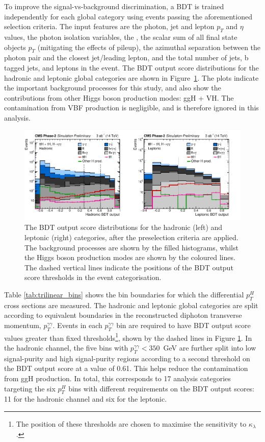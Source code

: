 To improve the signal-vs-background discrimination, a BDT is trained independently for each global category using events passing the aforementioned selection criteria. The input features are the photon, jet and lepton $p_T$ and $\eta$ values, the photon isolation variables, the \met, the scalar sum of all final state objects $p_T$ (mitigating the effects of pileup), the azimuthal separation between the photon pair and the closest jet/leading lepton, and the total number of jets, b tagged jets, and leptons in the event. The BDT output score distributions for the hadronic and leptonic global categories are shown in Figure~\ref{fig:trilinear_bdt}. The plots indicate the important background processes for this study, and also show the contributions from other Higgs boson production modes: ggH + VH. The contamination from VBF production is negligible, and is therefore ignored in this analysis.

\begin{figure}
  \centering
  \includegraphics[width=1\textwidth]{Figures/cms/trilinear/CMS-PAS-FTR-18-020_Figure_002.pdf}
  \caption[BDT output score distributions for the HL-LHC sensitivity study]
  {
    The BDT output score distributions for the hadronic (left) and leptonic (right) categories, after the preselection criteria are applied. The background processes are shown by the filled histograms, whilst the Higgs boson production modes are shown by the coloured lines. The dashed vertical lines indicate the positions of the BDT output score thresholds in the event categorisation.
  }
  \label{fig:trilinear_bdt}
\end{figure}

Table \ref{tab:trilinear_bins} shows the bin boundaries for which the differential $p_T^H$ cross sections are measured. The hadronic and leptonic global categories are split according to equivalent boundaries in the reconstructed diphoton transverse momentum, $p_T^{\gamma\gamma}$. Events in each $p_T^{\gamma\gamma}$ bin are required to have BDT output score values greater than fixed thresholds\footnote{The position of these thresholds are chosen to maximise the sensitivity to $\kappa_\lambda$.}, shown by the dashed lines in Figure \ref{fig:trilinear_bdt}. In the hadronic channel, the five bins with $p_T^{\gamma\gamma}<350$~GeV are further split into low signal-purity and high signal-purity regions according to a second threshold on the BDT output score at a value of 0.61. This helps reduce the contamination from ggH production. In total, this corresponds to 17 analysis categories targeting the six $p_T^H$ bins with different requirements on the BDT output scores: 11 for the hadronic channel and six for the leptonic.

